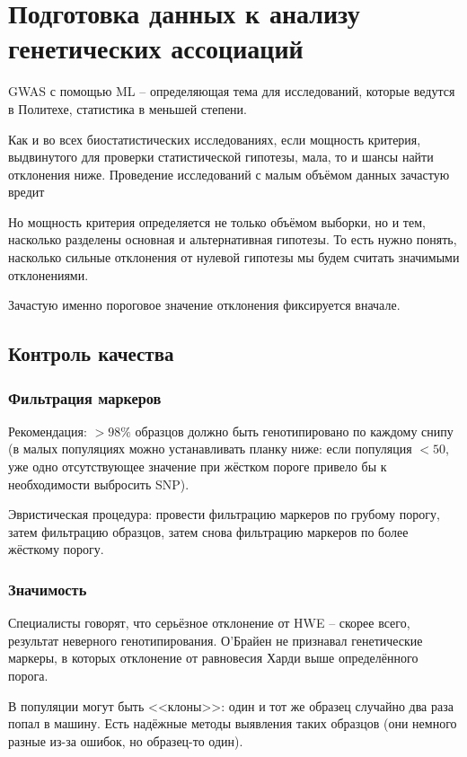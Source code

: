 \documentclass[main.tex]{subfiles}
\begin{document}
\section{Подготовка данных к анализу генетических ассоциаций}
\begin{leftbar}
GWAS с помощью  ML -- определяющая тема для исследований, которые ведутся в Политехе, статистика в меньшей степени.
\end{leftbar}

Как и во всех биостатистических исследованиях, если мощность критерия, выдвинутого для проверки статистической гипотезы, мала, то и шансы найти отклонения ниже.
Проведение исследований с малым объёмом данных зачастую вредит 

Но мощность критерия определяется не только объёмом выборки, но и тем, насколько разделены основная и альтернативная гипотезы.
То есть нужно понять, насколько сильные отклонения от нулевой гипотезы мы будем считать значимыми отклонениями.

Зачастую именно пороговое значение отклонения фиксируется вначале.

\subsection{Контроль качества}

\subsubsection{Фильтрация маркеров}

Рекомендация: $ >98\% $ образцов должно быть генотипировано по каждому снипу (в малых популяциях можно устанавливать планку ниже: если популяция $<50$, уже одно отсутствующее значение при жёстком пороге привело бы к необходимости выбросить SNP).

Эвристическая процедура: провести фильтрацию маркеров по грубому порогу, затем фильтрацию образцов, затем снова фильтрацию маркеров по более жёсткому порогу.

\subsubsection{Значимость }

Специалисты говорят, что серьёзное отклонение от HWE -- скорее всего, результат неверного генотипирования.
О'Брайен не признавал генетические маркеры, в которых отклонение от равновесия Харди выше определённого порога.

В популяции могут быть <<клоны>>: один и тот же образец случайно два раза попал в машину.
Есть надёжные методы выявления таких образцов (они немного разные из-за ошибок, но образец-то один).
\end{document}
